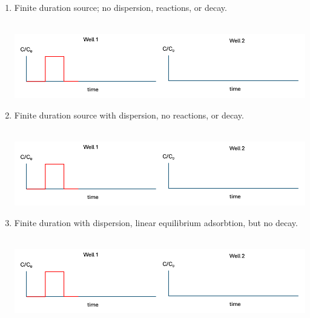 \documentclass[12pt]{article}
\begin{document}
\begin{enumerate}
\begin{enumerate}
\begin{center}
\end{center}
\item Finite duration source; no dispersion, reactions, or decay. ~\\~\\
\begin{center}
\includegraphics[width=6in]{PulseHistory.png} 
\end{center}
\clearpage %
\item Finite duration source with dispersion, no reactions, or decay. ~\\~\\
\begin{center}
\includegraphics[width=6in]{PulseHistory.png} 
\end{center}
\item Finite duration with dispersion, linear equilibrium adsorbtion, but no decay. ~\\~\\
\begin{center}
\includegraphics[width=6in]{PulseHistory.png} 

\end{center}
\end{enumerate}
\end{enumerate}
\end{document}
